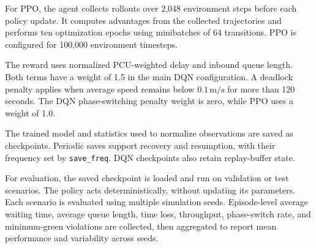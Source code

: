 For PPO, the agent collects rollouts over 2,048 environment steps before each policy update. It computes advantages from the collected trajectories and performs ten optimization epochs using minibatches of 64 transitions. PPO is configured for 100,000 environment timesteps.

The reward uses normalized PCU-weighted delay and inbound queue length. Both terms have a weight of 1.5 in the main DQN configuration. A deadlock penalty applies when average speed remains below $0.1\,\mathrm{m/s}$ for more than 120 seconds. The DQN phase-switching penalty weight is zero, while PPO uses a weight of 1.0.

The trained model and statistics used to normalize observations are saved as checkpoints. Periodic saves support recovery and resumption, with their frequency set by \texttt{save\_freq}. DQN checkpoints also retain replay-buffer state.

For evaluation, the saved checkpoint is loaded and run on validation or test scenarios. The policy acts deterministically, without updating its parameters. Each scenario is evaluated using multiple simulation seeds. Episode-level average waiting time, average queue length, time loss, throughput, phase-switch rate, and minimum-green violations are collected, then aggregated to report mean performance and variability across seeds.
